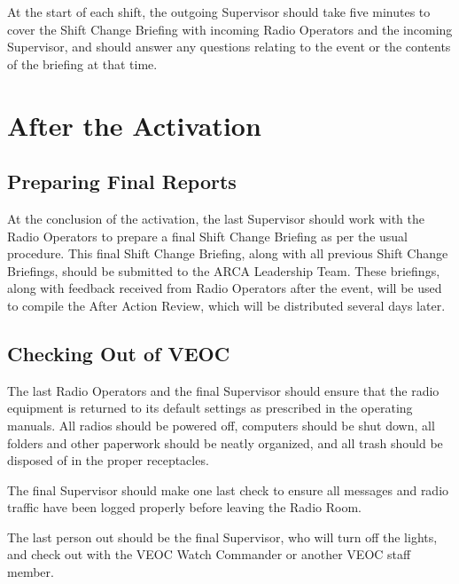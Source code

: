 \documentclass[pdflatex,letterpaper,twoside,12pt]{book}
\begin{document}
At the start of each shift, the outgoing Supervisor should take five minutes to cover the Shift Change Briefing with incoming Radio Operators and the incoming Supervisor, and should answer any questions relating to the event or the contents of the briefing at that time.


\section{After the Activation}

\subsection{Preparing Final Reports}

At the conclusion of the activation, the last Supervisor should work with the Radio Operators to prepare a final Shift Change Briefing as per the usual procedure.  This final Shift Change Briefing, along with all previous Shift Change Briefings, should be submitted to the ARCA Leadership Team.  These briefings, along with feedback received from Radio Operators after the event, will be used to compile the After Action Review, which will be distributed several days later.

\subsection{Checking Out of VEOC}

The last Radio Operators and the final Supervisor should ensure that the radio equipment is returned to its default settings as prescribed in the operating manuals.  All radios should be powered off, computers should be shut down, all folders and other paperwork should be neatly organized, and all trash should be disposed of in the proper receptacles.

The final Supervisor should make one last check to ensure all messages and radio traffic have been logged properly before leaving the Radio Room.

The last person out should be the final Supervisor, who will turn off the lights, and check out with the VEOC Watch Commander or another VEOC staff member.

\end{document}
